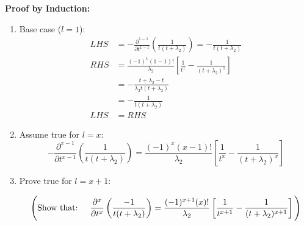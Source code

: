 \begin{itemize}
    \textbf{Proof by Induction:}
    \begin{enumerate}
        \item Base case (\(l=1\)):
        \begin{equation*}
            \begin{split}
                LHS &= -\frac{\partial^{1-1}}{\partial t^{1-1}}
                \left( \frac{1}{t(t + \lambda_2)}\right) =
                - \frac{1}{t(t + \lambda_2)} \\
                RHS &= \frac{(-1)^{1} (1-1)!}{\lambda_2}
                \left[\frac{1}{t^1} - \frac{1}{(t + \lambda_2)^1}\right] \\
                &= - \frac{t + \lambda_2 - t}{\lambda_2 t (t + \lambda_2)} \\
                &= - \frac{1}{t (t + \lambda_2)} \\
                LHS &= RHS
            \end{split}
        \end{equation*}
        \item Assume true for \(l = x\):
        \begin{equation*}
            -\frac{\partial^{x-1}}{\partial t^{x-1}}
            \left( \frac{1}{t(t + \lambda_2)}\right) =
            \frac{(-1)^{x} (x-1)!}{\lambda_2}
            \left[\frac{1}{t^x} - \frac{1}{(t + \lambda_2)^x}\right]
        \end{equation*}
        \item Prove true for \(l = x + 1\):
        
        \small
        \[
            \Bigg( \text{Show that:} \hspace{0.5cm}
            \frac{\partial^x}{\partial t ^ x}
            \left( \frac{-1}{t (t + \lambda_2)} \right) =
            \frac{(-1)^{x + 1} (x)!}{\lambda_2}
            \left[\frac{1}{t^{x+1}}-\frac{1}{(t + \lambda_2)^{x+1}}\right]\Bigg)
        \]
        \normalsize


\end{enumerate}
\end{itemize}
